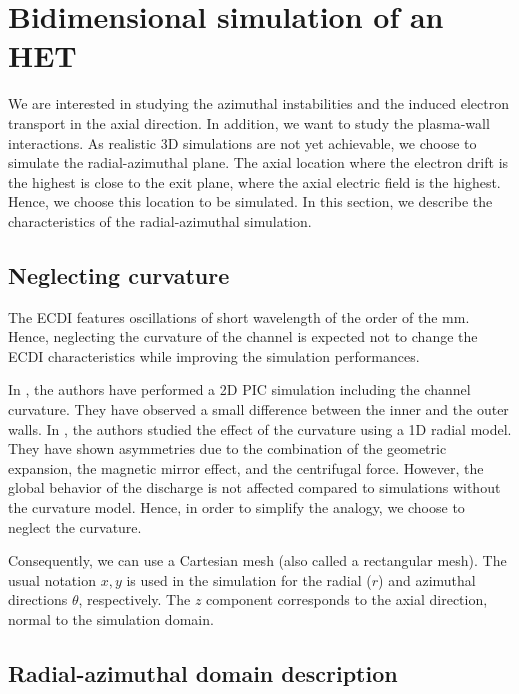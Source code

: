 
\section{Bidimensional simulation of an \ac{HET}}

We are interested in studying the azimuthal instabilities and the induced electron transport in the axial direction.
In addition, we want to study the plasma-wall interactions.
As realistic \ac{3D} simulations are not yet achievable, we choose to simulate the radial-azimuthal plane.
The axial location where the electron drift is the highest is close to the exit plane, where the axial electric field is the highest.
Hence, we choose this location to be simulated.
In this section, we describe the characteristics of the radial-azimuthal simulation.


\subsection{Neglecting curvature}
The \ac{ECDI} features oscillations of short wavelength of the order of the mm.
Hence, neglecting the curvature of the channel is expected not to change the \ac{ECDI} characteristics while improving the simulation performances.

In  \citet{heron2013},  the authors have performed a \ac{2D} \ac{PIC} simulation including the channel curvature.
They have observed a small difference between the inner and the outer walls.
In  \citet{dominguez-vazquez2018}, the authors studied the effect of the curvature using a \ac{1D} radial model.
They have shown asymmetries due to the combination of the geometric expansion, the magnetic mirror effect, and the centrifugal force.
However, the global behavior of the discharge is not affected compared to simulations without the curvature model.
Hence, in order to simplify the analogy, we choose to neglect the curvature.

Consequently, we can use a Cartesian mesh (also called a rectangular mesh).
The usual notation $x,y$ is used in the simulation for the radial ($r$) and azimuthal directions $\theta$, respectively.
The $z$ component corresponds to the axial direction, normal to the simulation domain.

\subsection{Radial-azimuthal domain description}

